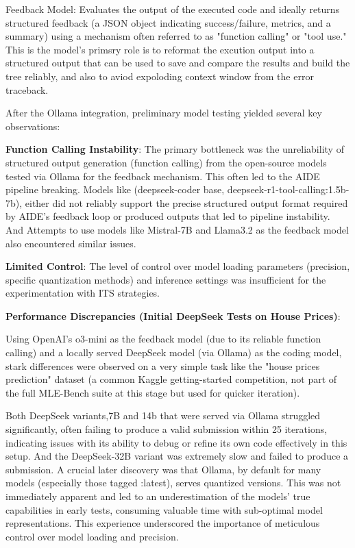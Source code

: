 Feedback Model: Evaluates the output of the executed code and ideally returns structured feedback (a JSON object indicating success/failure, metrics, and a summary) using a mechanism often referred to as "function calling" or "tool use." This is the model's primsry role is to reformat the excution output into a structured output that can be used to save and compare the results and build the tree reliably, and also to aviod expoloding context window from the error traceback.

After the Ollama integration, preliminary model testing yielded several key observations:

\textbf{Function Calling Instability}: The primary bottleneck was the unreliability of structured output generation (function calling) from the open-source models tested via Ollama for the feedback mechanism. This often led to the AIDE pipeline breaking.
Models like (deepseek-coder base, deepseek-r1-tool-calling:1.5b-7b), either did not reliably support the precise structured output format required by AIDE's feedback loop or produced outputs that led to pipeline instability. And Attempts to use models like Mistral-7B and Llama3.2 as the feedback model also encountered similar issues.

\textbf{Limited Control}: The level of control over model loading parameters (precision, specific quantization methods) and inference settings was insufficient for the experimentation with ITS strategies.

\textbf{Performance Discrepancies (Initial DeepSeek Tests on House Prices)}:

Using OpenAI's o3-mini as the feedback model (due to its reliable function calling) and a locally served DeepSeek model (via Ollama) as the coding model, stark differences were observed on a very simple task like the "house prices prediction" dataset (a common Kaggle getting-started competition, not part of the full MLE-Bench suite at this stage but used for quicker iteration).

Both DeepSeek variants,7B and 14b that were served via Ollama struggled significantly, often failing to produce a valid submission within 25 iterations, indicating issues with its ability to debug or refine its own code effectively in this setup. And the DeepSeek-32B variant was extremely slow and failed to produce a submission. A crucial later discovery was that Ollama, by default for many models (especially those tagged :latest), serves quantized versions. This was not immediately apparent and led to an underestimation of the models' true capabilities in early tests, consuming valuable time with sub-optimal model representations. This experience underscored the importance of meticulous control over model loading and precision.

